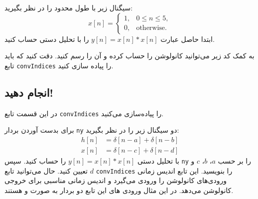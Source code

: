 \documentclass{utsignal}
\begin{document}
	سیگنال زیر با طول محدود را در نظر بگیرید:
	$$
	x[n]=\begin{cases}
		1, & 0 \le n \le 5,\\
		0, & \text{otherwise}.
	\end{cases}
	$$
	ابتدا حاصل عبارت $y[n]=x[n]*x[n]$ را با تحلیل دستی حساب کنید.
	
	به کمک کد زیر می‌توانید کانولوشن را حساب کرده و آن را رسم کنید. دقت کنید که باید تابع \lstinline[language=Octave]{convIndices} را پیاده سازی کنید.
	\begin{latin}
		
	\end{latin}
	
	\subsection{انجام دهید!}
	در این قسمت تابع \lstinline[language=Octave]{convIndices} را پیاده‌سازی می‌کنید.
	
	برای بدست آوردن بردار \lstinline[language=Octave]{ny} دو سیگنال زیر را در نظر بگیرید:
	\begin{align*}
	h[n] &= \delta[n - a] + \delta[n - b]\\
	x[n] &= \delta[n - c] + \delta[n - d]
	\end{align*}
	با تحلیل دستی $y[n]=x[n]*x[n]$ را حساب کنید. سپس \lstinline[language=Octave]{ny} را بر حسب $a$، $b$، $c$ و $d$ تعیین کنید. حال می‌توانید تابع  \lstinline[language=Octave]{convIndices} را بنویسید. این تابع اندیس زمانی ورودی‌های کانولوشن را ورودی می‌گیرد و اندیس زمانی مناسبی برای خروجی کانولوشن می‌دهد. در این مثال ورودی های این تابع دو بردار به صورت  و  هستند.
		
	
\end{document}
